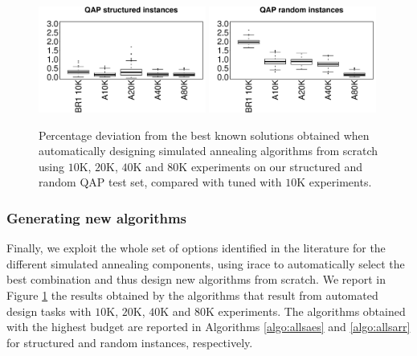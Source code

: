 \begin{figure}[tb]
  \begin{center}
    \includegraphics[width=0.49\textwidth]{Part 2 - Search-Based Optimization/Simulated Annealing/figures/esall-bxp.pdf}
    \includegraphics[width=0.49\textwidth]{Part 2 - Search-Based Optimization/Simulated Annealing/figures/rrall-bxp.pdf}
  \end{center}
  \caption{Percentage deviation from the best known solutions obtained
  when automatically designing simulated annealing algorithms from scratch using $10$K, $20$K, 
  $40$K and $80$K experiments on our structured and random QAP test set, compared
  with \brsa tuned with $10$K experiments.}
  \label{fig:res2qap}
\end{figure}


\subsubsection{Generating new algorithms}
Finally, we exploit the whole set of options identified in the literature
for the different simulated annealing components, using irace to automatically select
the best combination and thus design new algorithms from scratch. We report
in Figure \ref{fig:res2qap}
the results obtained by the algorithms that result from automated design tasks
with $10$K, $20$K, $40$K and $80$K experiments.
The algorithms obtained with the highest budget are reported 
in Algorithms \ref{algo:allsaes} and \ref{algo:allsarr} for 
structured and random instances, respectively.


